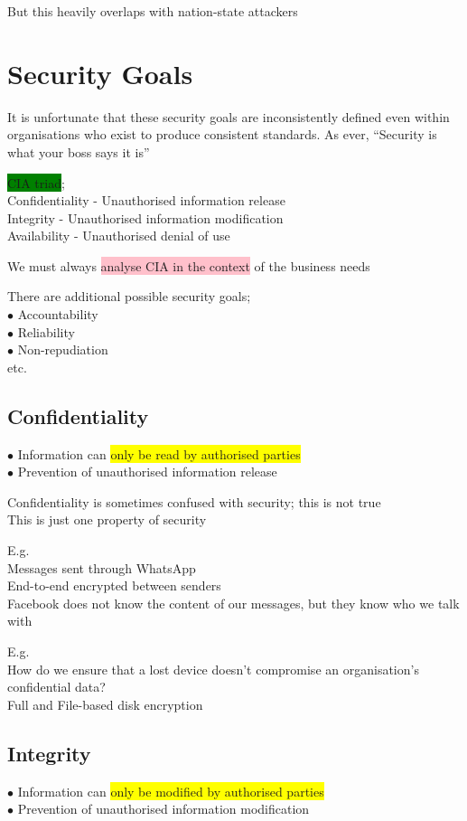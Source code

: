 \documentclass[tikz,border=10pt]{project_plan}
\newcommand{\bulletPoint}{\hspace{-3.1pt}$\bullet$ \hspace{5pt}}
\begin{document}
But this heavily overlaps with nation-state attackers

\section{Security Goals}

It is unfortunate that these security goals are inconsistently defined even within organisations who exist to produce consistent standards.
As ever, “Security is what your boss says it is”

\colorbox{green}{CIA triad};\\
Confidentiality - Unauthorised information release\\
Integrity - Unauthorised information modification\\
Availability - Unauthorised denial of use

We must always \colorbox{pink}{analyse CIA in the context} of the business needs

There are additional possible security goals;\\
\bulletPoint Accountability\\
\bulletPoint Reliability\\
\bulletPoint Non-repudiation\\
etc.

\subsection{Confidentiality}
\bulletPoint Information can \colorbox{yellow}{only be read by authorised parties}\\
\bulletPoint Prevention of unauthorised information release

Confidentiality is sometimes confused with security; this is not true\\
This is just one property of security

E.g.\\
Messages sent through WhatsApp\\
End-to-end encrypted between senders\\
Facebook does not know the content of our messages, but they know who we talk with

E.g.\\
How do we ensure that a lost device doesn't compromise an organisation's confidential data?\\
Full and File-based disk encryption

\subsection{Integrity}
\bulletPoint Information can \colorbox{yellow}{only be modified by authorised parties}\\
\bulletPoint Prevention of unauthorised information modification
\end{document}
